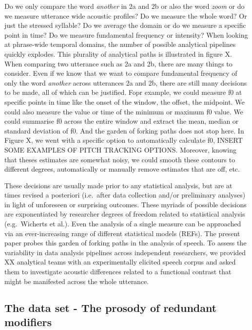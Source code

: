 \documentclass[
  english,
  man,floatsintext]{apa6}
\begin{document}
Do we only compare the word \emph{another} in 2a and 2b or also the word \emph{zoom} or do we measure utterance wide acoustic profiles? Do we measure the whole word? Or just the stressed syllable?
Do we average the domain or do we measure a specific point in time? Do we measure fundamental frequency or intensity? When looking at phrase-wide temporal domains, the number of possible analytical pipelines quickly explodes. This plurality of analytical paths is illustrated in figure X. When comparing two utterance such as 2a and 2b, there are many things to consider. Even if we know that we want to compare fundamental frequency of only the word \emph{another} across utterances 2a and 2b, there are still many decisions to be made, all of which can be justified. Fopr example, we could measure f0 at specific points in time like the onset of the window, the offset, the midpoint. We could also measure the value or time of the minimum or maximum f0 value. We could summarise f0 across the entire window and extract the mean, median or standard deviation of f0. And the garden of forking paths does not stop here. In Figure X, we went with a specific option to automatically calculate f0, INSERT SOME EXAMPLES OF PITCH TRACKING OPTIONS. Moreover, knowing that theses estimates are somewhat noisy, we could smooth these contours to different degrees, automatically or manually remove estimates that are off, etc.

These decisions are usually made prior to any statistical analysis, but are at times revised a posteriori (i.e.~after data collection and/or preliminary analyses) in light of unforeseen or surprising outcomes.
These myriads of possible decisions are exponentiated by researcher degrees of freedom related to statistical analysis (e.g.~Wicherts et al.).
Even the analysis of a single measure can be approached via an ever-increasing range of different statistical models (REFs).
The present paper probes this garden of forking paths in the analysis of speech.
To assess the variability in data analysis pipelines across independent researchers, we provided XX analytical teams with an experimentally elicited speech corpus and asked them to investigate acoustic differences related to a functional contrast that might be manifested across the whole utterance.

\hypertarget{the-data-set---the-prosody-of-redundant-modifiers}{%
\subsection{The data set - The prosody of redundant modifiers}\label{the-data-set---the-prosody-of-redundant-modifiers}}
\end{document}
